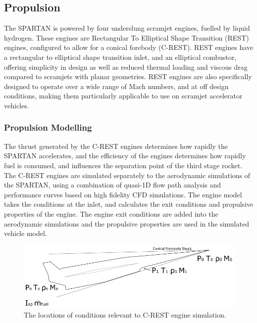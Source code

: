 \subsection{Propulsion}\label{sec:propulsion}

The SPARTAN is powered by four underslung scramjet engines, fuelled by liquid hydrogen. These engines are Rectangular To Elliptical Shape Transition (REST) engines, configured to allow for a conical forebody (C-REST). REST engines have a rectangular to elliptical shape transition inlet, and an elliptical combustor, offering simplicity in design as well as reduced thermal loading and viscous drag compared to scramjets with planar geometries\cite{Suraweera2009}.  REST engines are also specifically designed to operate over a wide range of Mach numbers, and at off design conditions, making them particularly applicable to use on scramjet accelerator vehicles. 


\subsubsection{Propulsion Modelling}\label{sec:Propulsion}

 The thrust generated by the C-REST engines determines how rapidly the SPARTAN accelerates, and the efficiency of the engines determines how rapidly fuel is consumed, and influences the separation point of the third stage rocket. The C-REST engines are simulated separately to the aerodynamic simulations of the SPARTAN, using a combination of quasi-1D flow path analysis and performance curves based on high fidelity CFD simulations\cite{Preller2017b,Preller2018a}. The engine model takes the conditions at the inlet, and calculates the exit conditions and propulsive properties of the engine. The engine exit conditions are added into the aerodynamic simulations and the propulsive properties are used in the simulated vehicle model.
\begin{figure}[ht]
	\centering
	\includegraphics[width=0.7\linewidth]{figures/3_vehicle_design/SPARTANEngineshock}
	\caption{The locations of conditions relevant to C-REST engine simulation. }
	\label{fig:SPARTANEngineshock}
\end{figure}


